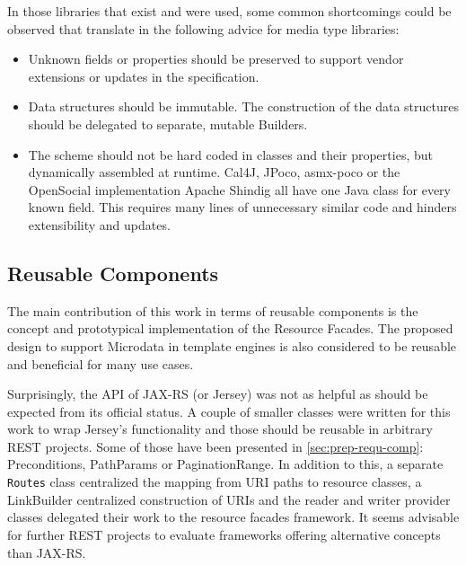 \documentclass[11pt,a4paper,headsepline,twoside]{scrartcl}		%
\begin{document}
In those libraries that exist and were used, some common shortcomings could be
observed that translate in the following advice for media type libraries:

\begin{itemize}
\item Unknown fields or properties should be preserved to support vendor
  extensions or updates in the specification.
\item Data structures should be immutable. The construction of the data
  structures should be delegated to separate, mutable Builders.
\item The scheme should not be hard coded in classes and their properties, but
  dynamically assembled at runtime. Cal4J, JPoco, asmx-poco or the OpenSocial
  implementation Apache Shindig all have one Java class for every known field.
  This requires many lines of unnecessary similar code and hinders extensibility
  and updates.
\end{itemize}

\subsection{Reusable Components}
\label{sec:reusable-components}

The main contribution of this work in terms of reusable components is the
concept and prototypical implementation of the Resource Facades. The proposed
design to support Microdata in template engines is also considered to be
reusable and beneficial for many use cases.

Surprisingly, the API of JAX-RS (or Jersey) was not as helpful as should be
expected from its official status. A couple of smaller classes were written for
this work to wrap Jersey's functionality and those should be reusable in
arbitrary REST projects. Some of those have been presented in
\autoref{sec:prep-requ-comp}: Preconditions, PathParams or PaginationRange. In
addition to this, a separate \lstinline:Routes: class centralized the mapping
from URI paths to resource classes, a LinkBuilder centralized construction of
URIs and the reader and writer provider classes delegated their work to the
resource facades framework. It seems advisable for further REST projects to
evaluate frameworks offering alternative concepts than JAX-RS.

\end{document}
